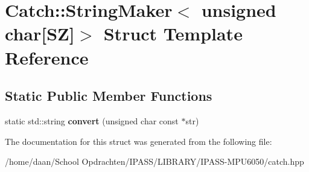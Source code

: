 \hypertarget{structCatch_1_1StringMaker_3_01unsigned_01char[SZ]_4}{}\section{Catch\+:\+:String\+Maker$<$ unsigned char\mbox{[}SZ\mbox{]}$>$ Struct Template Reference}
\label{structCatch_1_1StringMaker_3_01unsigned_01char[SZ]_4}
\subsection*{Static Public Member Functions}
\begin{DoxyCompactItemize}
\item 
\mbox{\label{structCatch_1_1StringMaker_3_01unsigned_01char[SZ]_4_a590d64c72b0cc75c113f1eea95d52b66}} 
static std\+::string {\bfseries convert} (unsigned char const $\ast$str)
\end{DoxyCompactItemize}


The documentation for this struct was generated from the following file\+:\begin{DoxyCompactItemize}
\item 
/home/daan/\+School Opdrachten/\+I\+P\+A\+S\+S/\+L\+I\+B\+R\+A\+R\+Y/\+I\+P\+A\+S\+S-\/\+M\+P\+U6050/catch.\+hpp\end{DoxyCompactItemize}
